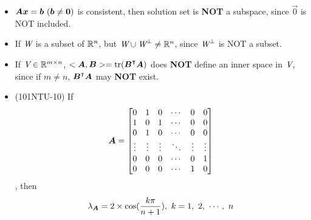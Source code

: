 \begin{itemize}
    \item $\boldsymbol{A}\boldsymbol{x} = \boldsymbol{b} \ (\boldsymbol{b} \neq \boldsymbol{0})$ is consistent, then solution set is \textbf{NOT} a subspace, since $\vec{0}$ is NOT included.
    \item If $\textit{W}$ is a subset of $\mathbb{R}^n$, but $\textit{W} \cup \textit{W}^\perp \neq \mathbb{R}^n$, since $\textit{W}^\perp$ is NOT a subset.
    \item If $\textit{V} \in \mathbb{R}^{m \times n}$, $<\boldsymbol{A}, \boldsymbol{B}> = \operatorname{tr}(\boldsymbol{B}^\intercal\boldsymbol{A})$ does \textbf{NOT} define an inner space in $\textit{V}$, since if $m \neq n$, $\boldsymbol{B}^\intercal\boldsymbol{A}$ may \textbf{NOT} exist.
    \item (101NTU-10) If \begin{equation}
        \boldsymbol{A} = 
        \begin{bmatrix} 
            0 & 1 & 0 & \cdots & 0 & 0 \\
            1 & 0 & 1 & \cdots & 0 & 0 \\
            0 & 1 & 0 & \cdots & 0 & 0 \\
            \vdots & \vdots & \vdots & \ddots & \vdots & \vdots \\
            0 & 0 & 0 & \cdots & 0 & 1 \\
            0 & 0 & 0 & \cdots & 1 & 0
        \end{bmatrix}
    \end{equation}, then \begin{equation}
        \lambda_{\boldsymbol{A}} = 2 \times \cos(\frac{k\pi}{n + 1}), \ k = 1,\ 2, \ \cdots, \ n
    \end{equation}
\end{itemize}

\pagebreak

